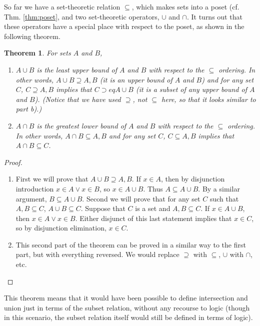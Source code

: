 \documentclass[12pt]{article}
\newcounter{thmc}
\newtheorem{thm}[thmc]{Theorem}
\begin{document}
So far we have a set-theoretic relation $\subseteq$, which makes sets
into a poset (cf. Thm. \ref{thm:poset}, and two set-theoretic
operators, $\cup$ and $\cap$.  It turns out that these operators have
a special place with respect to the poset, as shown in the following
theorem.

\begin{thm}
  For sets $A$ and $B$,
  \begin{enumerate}[label=\alph*)]
    \item $A\cup B$ is the \textit{least upper bound} of $A$ and $B$
      with respect to the $\subseteq$ ordering.  In other words,
      $A\cup B\supseteq A, B$ (it is \textit{an} upper bound of $A$
      and $B$) and for any set $C$, $C\supseteq A, B$ implies that
      $C\supset eq A\cup B$ (it is a subset of any upper bound of $A$
      and $B$). (Notice that we have used $\supseteq$, not $\subseteq$
      here, so that it looks similar to part b).)
    \item $A\cap B$ is the \textit{greatest lower bound} of $A$ and
      $B$ with respect to the $\subseteq$ ordering.  In other words,
      $A\cap B\subseteq A,B$ and for any set $C$, $C\subseteq A,B$
      implies that $A\cap B \subseteq C$.
  \end{enumerate}
\end{thm}

\begin{proof}
  \begin{enumerate}[label=\alph*)]
    \item First we will prove that $A\cup B\supseteq A,B$.  If $x\in
      A$, then by disjunction introduction $x\in A \vee x\in B$, so
      $x\in A\cup B$.  Thus $A\subseteq A\cup B$.  By a similar
      argument, $B\subseteq A\cup B$.  Second we will prove that for
      any set $C$ such that $A,B\subseteq C$, $A\cup B\subseteq C$.
      Suppose that $C$ is a set and $A,B\subseteq C$.  If $x\in A\cup
      B$, then $x\in A \vee x\in B$.  Either disjunct of this last
      statement implies that $x\in C$, so by disjunction elimination,
      $x\in C$.
    \item This second part of the theorem can be proved in a similar
      way to the first part, but with everything reversed.  We would
      replace $\supseteq$ with $\subseteq$, $\cup$ with $\cap$, etc.
  \end{enumerate}
\end{proof}

This theorem means that it would have been possible to define
intersection and union just in terms of the subset relation, without
any recourse to logic (though in this scenario, the subset relation
itself would still be defined in terms of logic).
\end{document}
